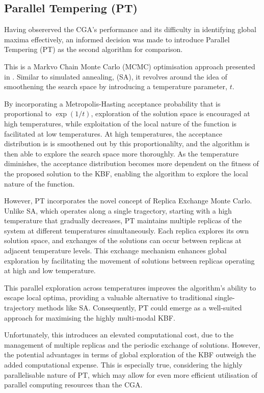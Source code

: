 \documentclass[10pt]{article}
\begin{document}
\newpage

\begin{multicols}{2}
\section{Parallel Tempering (PT)}
\label{sec:PT}

Having obsererved the CGA's performance and its difficulty in identifying global maxima effectively, an informed decision was made to introduce Parallel Tempering (PT) as the second algorithm for comparison.

This is a Markvo Chain Monte Carlo (MCMC) optimisation approach presented in \cite{Earl_2005}. Similar to simulated annealing, (SA), it revolves around the idea of smoothening the search space by introducing a temperature parameter, $t$. 

By incorporating a Metropolis-Hasting acceptance probability that is proportional to $\exp(1/t)$, exploration of the solution space is encouraged at high temperatures, while exploitation of the local nature of the function is facilitated at low temperatures. At high temperatures, the acceptance distribution is is smoothened out by this proportionalilty, and the algorithm is then able to explore the search space more thoroughly. As the temperature diminishes, the acceptance distribution becomes more dependent on the fitness of the proposed solution to the KBF, enabling the algorithm to explore the local nature of the function.

However, PT incorporates the novel concept of Replica Exchange Monte Carlo. Unlike SA, which operates along a single tragectory, starting with a high temperature that gradually decreases, PT maintains multiple replicas of the system at different temperatures simultaneously. Each replica explores its own solution space, and exchanges of the solutions can occur between replicas at adjacent temperature levels. This exchange mechanism enhances global exploration by facilitating the movement of solutions between replicas operating at high and low temperature. 

This parallel exploration across temperatures improves the algorithm's ability to escape local optima, providing a valuable alternative to traditional single-trajectory methods like SA. Consequently, PT could emerge as a well-suited approach for maximising the highly multi-modal KBF.

Unfortunately, this introduces an elevated computational cost, due to the management of multiple replicas and the periodic exchange of solutions. However, the potential advantages in terms of global exploration of the KBF outweigh the added computational expense. This is especially true, considering the highly parallelisable nature of PT, which may allow for even more efficient utilisation of parallel computing resources than the CGA. 


\end{multicols}
\end{document}
